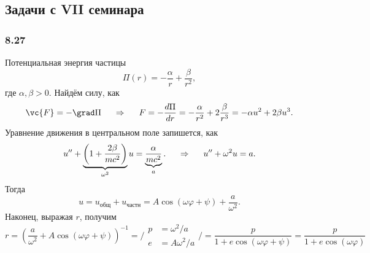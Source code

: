 \subsection{Задачи с VII семинара}
\subsubsection*{8.27}
Потенциальная энергия частицы
$$
    \Pi(r) = -\frac{\alpha}{r} + \frac{\beta}{r^2},
$$
где $\alpha, \beta > 0$.
Найдём силу, как
$$
    \vc{F} = - \grad \Pi 
    \hspace{0.5cm} \Rightarrow \hspace{0.5cm} 
     F = - \frac{d \Pi}{dr}  = -\frac{\alpha}{r^2} + 2 \frac{\beta}{r^3} = -\alpha u^2 + 2\beta u^3.
$$
Уравнение движения в центральном поле запишется, как
$$
    u'' + \underbrace{
    \left(1 + \frac{2\beta}{mc^2} \right)
    }_{\omega^2}
    u = \underbrace{\frac{\alpha}{mc^2}}_{a}.
    \hspace{0.5cm} \Rightarrow \hspace{0.5cm} 
    u'' + \omega^2 u = a.
$$
Тогда
$$
    u = u_{\text{общ}} + u_{\text{частн}} = A \cos \left(
        \omega \varphi + \psi
    \right) + \frac{a}{\omega^2} .
$$
Наконец, выражая $r$, получим
$$
    r = \left(
        \frac{a}{\omega^2} + A \cos \left(\omega \varphi + \psi\right)
    \right)^{-1} =
    \bigg/
    \begin{aligned}
        p &= \omega^2 / a \\
        e &= A \omega^2 / a
    \end{aligned}
    \bigg/ =
    \frac{p}{1 + e \cos \left(\omega \varphi + \psi\right)}
    =
    \frac{p}{1 + e \cos \left(\omega \varphi\right)}
$$

